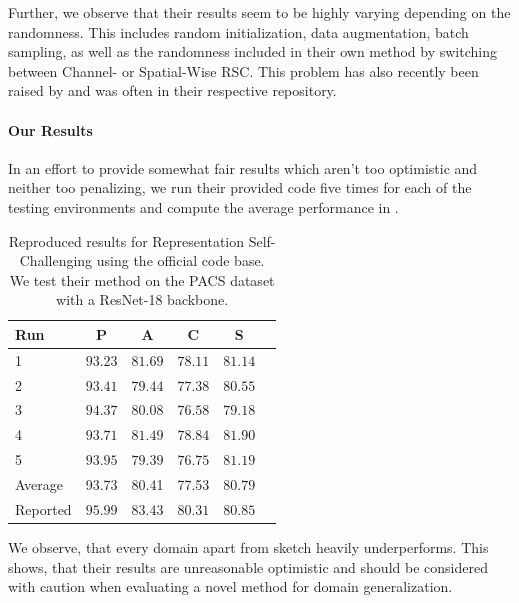 Further, we observe that their results seem to be highly varying depending on the randomness. This includes random initialization, data augmentation, batch sampling, as well as the randomness included in their own method by switching between Channel- or Spatial-Wise RSC. This problem has also recently been raised by \citet{nuriel2020permuted} and was often in their respective repository.

\paragraph{Our Results}
In an effort to provide somewhat fair results which aren't too optimistic and neither too penalizing, we run their provided code five times for each of the testing environments and compute the average performance in . 

\begin{table}[hb]
    \centering
    \begin{tabular}{lccccc}
    \toprule
    \textbf{Run}   &  \textbf{P} & \textbf{A} & \textbf{C} & \textbf{S} \\
    \midrule
    1    & $93.23$  & $81.69$ & $78.11$ & $81.14$ \\
    2    & $93.41$  & $79.44$ & $77.38$ & $80.55$ \\
    3    & $94.37$  & $80.08$ & $76.58$ & $79.18$ \\
    4    & $93.71$  & $81.49$ & $78.84$ & $81.90$ \\
    5    & $93.95$  & $79.39$ & $76.75$ & $81.19$ \\
    \midrule
    Average & 93.73 & 80.41 & 77.53 & $80.79$ \\
    Reported & $95.99$ & $83.43$ & $80.31$ & $80.85$ \\
    \bottomrule
    \end{tabular}
    \caption[Reproduced results for Representation Self-Challenging using the official code base]{Reproduced results for Representation Self-Challenging using the official code base. We test their method on the PACS dataset with a ResNet-18 backbone.} 
    \label{tab:reproduced-RSC}
\end{table}

We observe, that every domain apart from sketch heavily underperforms. This shows, that their results are unreasonable optimistic and should be considered with caution when evaluating a novel method for domain generalization.

